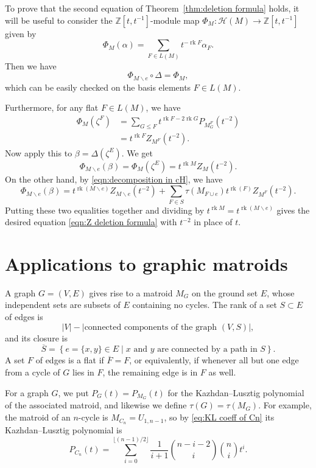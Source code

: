 \documentclass[12pt,reqno]{amsart}
\theoremstyle{definition}
\theoremstyle{remark}
\newcommand{\ssm}{\smallsetminus}
\newcommand{\rk}{\operatorname{rk}}
\newcommand{\Z}{{\mathbb{Z}}}
\renewcommand{\(}{\left(}
\renewcommand{\)}{\right)}
\newcommand{\<}{\left<}
\renewcommand{\>}{\right>}
\newcommand{\cal}{\mathcal}
\newcommand{\cH}{{\cal H}}
\begin{document}
To prove that the second equation of Theorem~\ref{thm:deletion formula} holds, 
it will be useful to 
consider the $\Z[t,t^{-1}]$-module map
$\Phi_M \colon \cH(M) \to \Z[t,t^{-1}]$ given by
\[\Phi_M(\alpha) = \sum_{F\in L(M)} t^{-\rk F}\alpha_F.\]
Then we have
\[\Phi_{M\ssm e} \circ \Delta = \Phi_M,\]
which can be easily checked on the basis elements $F \in L(M)$.

Furthermore, for any flat $F \in L(M)$, we have
\begin{align*}
\Phi_M(\zeta^F) & = \sum_{G \le F} t^{\rk F - 2\rk G}P_{M^F_G}(t^{-2})\\
& = t^{\rk F}Z_{M^F}(t^{-2}).
\end{align*}
Now apply this to $\beta = \Delta(\zeta^E)$.  We get
\[\Phi_{M\ssm e}(\beta) = \Phi_M(\zeta^E) = t^{\rk M}Z_M(t^{-2}).\]
On the other hand, by \eqref{eqn:decomposition in cH}, we have
\[\Phi_{M\ssm e}(\beta) = t^{\rk(M\ssm e)}Z_{M\ssm e}(t^{-2}) + \sum_{F \in S}\tau(M_{F\cup e})t^{\rk(F)}Z_{M^F}(t^{-2}).\]
Putting these two equalities together and dividing by $t^{\rk M}= t^{\rk(M\ssm e)}$ gives the desired equation \eqref{eqn:Z deletion formula} with $t^{-2}$ in place of $t$.  




\section{Applications to graphic matroids}

A graph $G = (V, E)$ 
gives rise to a matroid $M_G$ on the ground set $E$, whose  
independent sets are subsets of $E$ containing no cycles.  The rank of a set $S \subset E$ of edges is 
\[|V| - |\mbox{connected components of the graph } (V, S)|,\]
and its closure
is
\[\overline{S} = \left\{e = \{x,y\} \in E \mid x \mbox{ and } y \mbox{ are connected by a path in } S\right\}.\]
A set $F$ of edges is a flat if $\overline{F} = F$, or equivalently, if whenever all but one edge from a cycle of $G$ lies in $F$, the remaining edge is in $F$ as well. 

For a graph $G$, we put $P_G(t) = P_{M_G}(t)$ for the Kazhdan--Lusztig polynomial of the associated matroid, and likewise we define $\tau(G) = \tau(M_G)$.  For example, the matroid of an $n$-cycle is $M_{C_n} = U_{1,n-1}$, so by \eqref{eq:KL coeff of Cn} its 
Kazhdan--Lusztig polynomial is
\[P_{C_n}(t) = \sum_{i=0}^{\lfloor (n-1)/2\rfloor} \frac{1}{i+1}\binom{n-i-2}{i}\binom{n}{i}t^i.\] 
\end{document}
